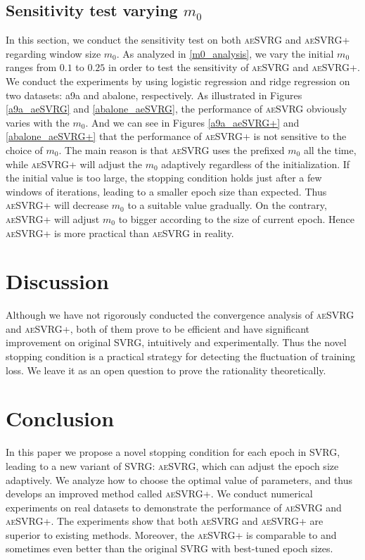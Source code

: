 \documentclass[conference]{IEEEtran}
\begin{document}
\subsection{Sensitivity test varying  $m_0$}
In this section, we conduct the sensitivity test on both \textsc{aeSVRG} and \textsc{aeSVRG+} regarding window size $m_0$. As analyzed in \ref{m0_analysis}, we vary the initial $m_0$ ranges from $0.1$ to $0.25$ in order to test the sensitivity of \textsc{aeSVRG} and \textsc{aeSVRG+}. We conduct the experiments by using logistic regression and ridge regression on two datasets: a9a and abalone, respectively. As illustrated in Figures \ref{a9a_aeSVRG} and \ref{abalone_aeSVRG}, the performance of \textsc{aeSVRG} obviously varies with the $m_0$. And we can see in Figures \ref{a9a_aeSVRG+} and \ref{abalone_aeSVRG+} that the performance of \textsc{aeSVRG+} is not sensitive to the choice of $m_0$. 
The main reason is that \textsc{aeSVRG} uses the prefixed $m_0$ all the time, while \textsc{aeSVRG+} will adjust the $m_0$ adaptively regardless of the initialization.
If the initial value is too large, the stopping condition holds just after a few windows of iterations, leading to a smaller epoch size than expected.
Thus \textsc{aeSVRG+} will decrease $m_0$ to a suitable value gradually. On the contrary, \textsc{aeSVRG+} will adjust $m_0$ to bigger according to the size of current epoch.  
Hence \textsc{aeSVRG+} is more practical than \textsc{aeSVRG} in reality.

\section{Discussion}
\label{discussion}
Although we have not rigorously conducted the convergence analysis of \textsc{aeSVRG} and \textsc{aeSVRG+}, both of them prove to be efficient and have significant improvement on original SVRG,  intuitively and experimentally. Thus the novel stopping condition is a practical strategy for detecting the fluctuation of training loss. We leave it as an open question to prove the rationality theoretically.

\section{Conclusion}
In this paper we propose a novel stopping condition for each epoch in SVRG, leading to a new variant of SVRG: \textsc{aeSVRG}, which can adjust the epoch size adaptively. We analyze how to choose the optimal value of parameters, and thus develops an improved method called \textsc{aeSVRG+}. We conduct numerical experiments on real datasets to demonstrate the performance of \textsc{aeSVRG} and \textsc{aeSVRG+}. The experiments show that both \textsc{aeSVRG} and \textsc{aeSVRG+} are superior to existing methods. Moreover, the \textsc{aeSVRG+} is comparable to and sometimes even better than the original SVRG with best-tuned epoch sizes.
\label{conclusion}
\end{document}
